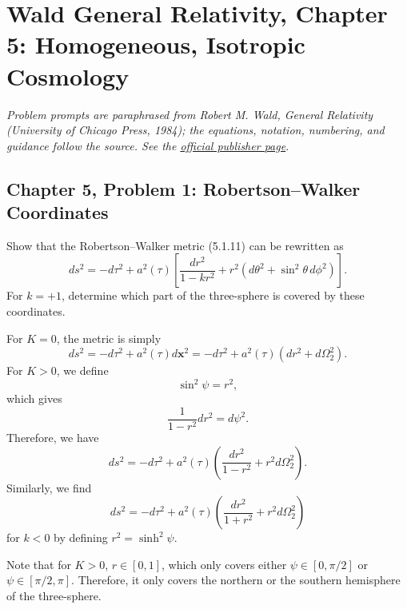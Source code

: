 \section{Wald General Relativity, Chapter 5: Homogeneous, Isotropic Cosmology}

\noindent\textit{Problem prompts are paraphrased from Robert M. Wald,
\emph{General Relativity} (University of Chicago Press, 1984); the equations,
notation, numbering, and guidance follow the source. See the
\href{https://press.uchicago.edu/ucp/books/book/chicago/G/bo5952261.html}{official publisher page}.}

\subsection{Chapter 5, Problem 1: Robertson--Walker Coordinates}

Show that the Robertson--Walker metric (5.1.11) can be rewritten as
\begin{equation}
    ds^2=-d\tau^2+a^2(\tau)\left[
        \frac{dr^2}{1-kr^2}
        +r^2\left(d\theta^2+\sin^2\theta\,d\phi^2\right)
    \right].
\end{equation}
For $k=+1$, determine which part of the three-sphere is covered by these
coordinates.
\begin{solution}
For $K=0$, the metric is simply
\begin{equation}
    ds^2 = - d\tau^2 + a^2(\tau)d\mathbf{x}^2 = - d\tau^2 + a^2(\tau)(dr^2 + d\Omega_2^2).
\end{equation}
For $K >0$, we define
\begin{equation}
    \sin^2\psi = r^2,
\end{equation}
which gives
\begin{equation}
    \frac{1}{1-r^2}dr^2 =d\psi^2.
\end{equation}
Therefore, we have
\begin{equation}
    ds^2 =-d\tau^2+a^2(\tau)\left(\frac{dr^2}{1-r^2} + r^2d\Omega_2^2\right).
\end{equation}
Similarly, we find
\begin{equation}
    ds^2 =-d\tau^2+a^2(\tau)\left(\frac{dr^2}{1+r^2} + r^2d\Omega_2^2\right)
\end{equation}
for $k<0$ by defining $r^2 = \sinh^2\psi$.

Note that for $K>0$, $r \in [0,1]$, which only covers either $\psi \in [0,\pi/2]$ or $\psi \in [\pi/2,\pi]$. Therefore, it only covers the northern or the southern hemisphere of the three-sphere.
\end{solution}

